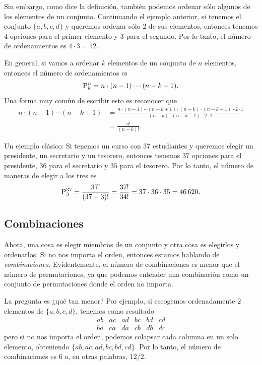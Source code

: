\informal
Sin embargo, como dice la definición, también podemos ordenar sólo algunos de los elementos de un conjunto. Continuando el ejemplo anterior, si tenemos el conjunto \(\{a, b, c, d\}\) y queremos ordenar sólo \(2\) de sus elementos, entonces tenemos \(4\) opciones para el primer elemento y \(3\) para el segundo. Por lo tanto, el número de ordenamientos es \(4 \cdot 3 = 12\).

\formal
En general, si vamos a ordenar \(k\) elementos de un conjunto de \(n\) elementos, entonces el número de ordenamientos es \[\mathrm{P}^{n}_{k} = n \cdot (n-1) \cdots (n-k+1).\] Una forma muy común de escribir esto es reconocer que \begin{align*}
n \cdot (n-1) \cdots (n-k+1) &= \frac{n \cdot (n-1) \cdots (n-k+1)\cdot (n-k)\cdot(n-k-1)\cdots 2 \cdot 1}{(n-k)\cdot(n-k-1)\cdots 2 \cdot 1} \\
&= \frac{n!}{(n-k)!}.
\end{align*}

\informal
Un ejemplo clásico: Si tenemos un curso con \(37\) estudiantes y queremos elegir un presidente, un secretario y un tesorero, entonces tenemos \(37\) opciones para el presidente, \(36\) para el secretario y \(35\) para el tesorero. Por lo tanto, el número de maneras de elegir a los tres es \[\mathrm{P}^{37}_{3} = \frac{37!}{(37-3)!} = \frac{37!}{34!} = 37 \cdot 36 \cdot 35 = \num{46620}.\]

\subsection{Combinaciones}
Ahora, una cosa es elegir miembros de un conjunto y otra cosa es elegirlos y ordenarlos. Si no nos importa el orden, entonces estamos hablando de \emph{combinaciones.} Evidentemente, el número de combinaciones es menor que el número de permutaciones, ya que podemos entender una combinación como un conjunto de permutaciones donde el orden no importa.

La pregunta es ¿qué tan menor? Por ejemplo, si escogemos ordenadamente \(2\) elementos de \(\{a, b, c, d\}\), tenemos como resultado
\[\begin{matrix}
	ab & ac & ad & bc & bd & cd \\
	ba & ca & da & cb & db & dc
\end{matrix}\] pero si no nos importa el orden, podemos colapsar cada columna en un solo elemento, obteniendo \(\{ab, ac, ad, bc, bd, cd\}\). Por lo tanto, el número de combinaciones es \(6\) o, en otras palabras, \(12/2\).

